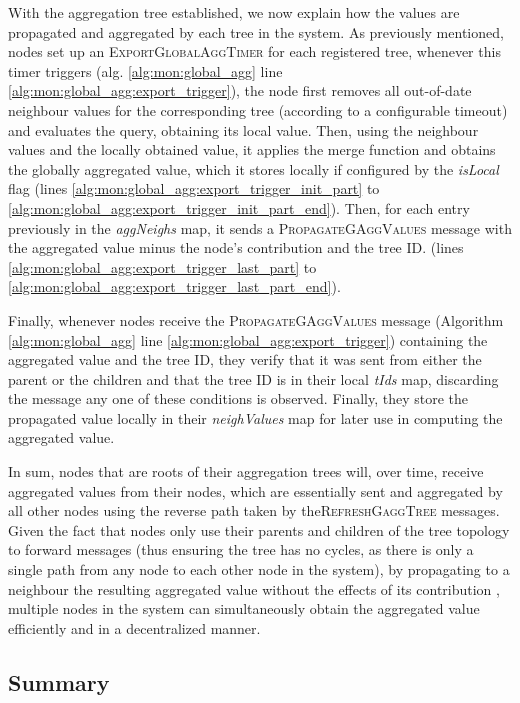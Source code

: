 With the aggregation tree established, we now explain how the values are propagated and aggregated by each tree in the system. As previously mentioned, nodes set up an \textsc{ExportGlobalAggTimer} for each registered tree, whenever this timer triggers (alg.  \ref{alg:mon:global_agg} line \ref{alg:mon:global_agg:export_trigger}), the node first removes all out-of-date neighbour values for the corresponding tree (according to a configurable timeout) and evaluates the query, obtaining its local value. Then, using the neighbour values and the locally obtained value, it applies the merge function and obtains the globally aggregated value, which it stores locally if configured by the \textit{isLocal} flag (lines \ref{alg:mon:global_agg:export_trigger_init_part} to \ref{alg:mon:global_agg:export_trigger_init_part_end}). Then, for each entry previously in the \textit{aggNeighs} map, it sends a \textsc{PropagateGAggValues} message with the aggregated value minus the node's contribution and the tree ID. (lines \ref{alg:mon:global_agg:export_trigger_last_part} to \ref{alg:mon:global_agg:export_trigger_last_part_end}). 

Finally, whenever nodes receive the \textsc{PropagateGAggValues} message (Algorithm \ref{alg:mon:global_agg} line \ref{alg:mon:global_agg:export_trigger}) containing the aggregated value and the tree ID, they verify that it was sent from either the parent or the children and that the tree ID is in their local \textit{tIds} map, discarding the message any one of these conditions is observed. Finally, they store the propagated value locally in their \textit{neighValues} map for later use in computing the aggregated value.

In sum, nodes that are roots of their aggregation trees will, over time, receive aggregated values from their nodes, which are essentially sent and aggregated by all other nodes using the reverse path taken by the\textsc{RefreshGaggTree} messages. Given the fact that nodes only use their parents and children of the tree topology to forward messages (thus ensuring the tree has no cycles, as there is only a single path from any node to each other node in the system), by propagating to a neighbour the resulting aggregated value without the effects of its contribution \cite{akosThesis}, multiple nodes in the system can simultaneously obtain the aggregated value efficiently and in a decentralized manner.

\subsection{Summary}

